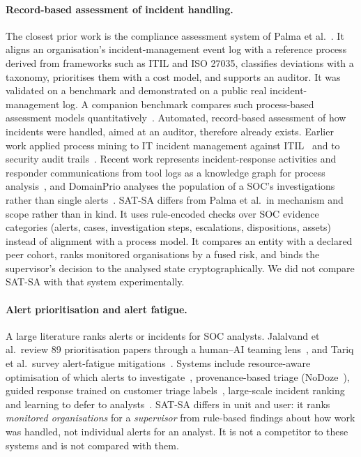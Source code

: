 \paragraph{Record-based assessment of incident handling.}
The closest prior work is the compliance assessment system of Palma et
al.~\cite{palma2024compliance}. It aligns an organisation's incident-management
event log with a reference process derived from frameworks such as ITIL and ISO
27035, classifies deviations with a taxonomy, prioritises them with a cost model,
and supports an auditor. It was validated on a benchmark and demonstrated on a public
real incident-management log. A companion benchmark compares such process-based
assessment models quantitatively~\cite{palma2024benchimp}. Automated, record-based
assessment of how incidents were handled, aimed at an auditor, therefore already
exists. Earlier work applied process mining to IT incident management against
ITIL~\cite{ferreira2008itil} and to security audit trails~\cite{vanderaalst2005security}.
Recent work represents incident-response activities and responder communications
from tool logs as a knowledge graph for process analysis~\cite{galadima2026irgraph},
and DomainPrio analyses the population of a SOC's investigations rather than single
alerts~\cite{chiba2022domainprio}. SAT-SA differs from Palma et al.\ in mechanism
and scope rather than in kind. It uses rule-encoded checks over SOC evidence
categories (alerts, cases, investigation steps, escalations, dispositions, assets)
instead of alignment with a process model. It compares an entity with a declared peer
cohort, ranks monitored organisations by a fused risk, and binds the supervisor's
decision to the analysed state cryptographically. We did not compare SAT-SA with
that system experimentally.

\paragraph{Alert prioritisation and alert fatigue.}
A large literature ranks alerts or incidents for SOC analysts. Jalalvand et
al.\ review 89 prioritisation papers through a human--AI teaming
lens~\cite{jalalvand2024prioritisation}, and Tariq et al.\ survey alert-fatigue
mitigations~\cite{tariq2025alertfatigue}. Systems include resource-aware
optimisation of which alerts to investigate~\cite{shah2019alertselection},
provenance-based triage (NoDoze~\cite{hassan2019nodoze}), guided response trained on
customer triage labels~\cite{freitas2024guide}, large-scale incident
ranking~\cite{freitas2026aip} and learning to defer to analysts~\cite{jalalvand2025l2d}.
SAT-SA differs in unit and user: it ranks \emph{monitored organisations} for a
\emph{supervisor} from rule-based findings about how work was handled, not individual
alerts for an analyst. It is not a competitor to these systems and is not compared
with them.

